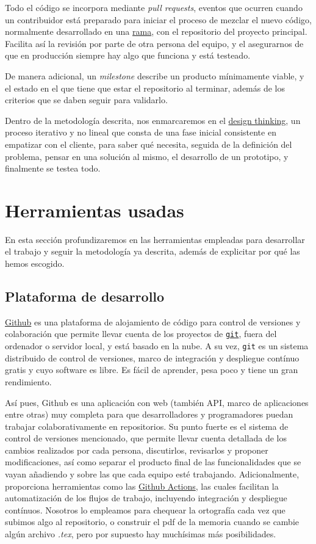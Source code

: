 Todo el código se incorpora mediante \textit{pull requests}, eventos que ocurren cuando un contribuidor está 
preparado para iniciar el proceso de mezclar el nuevo código, normalmente desarrollado en una \href{https://docs.github.com/github/collaborating-with-issues-and-pull-requests/about-branches}{rama}, 
con el repositorio del proyecto principal. Facilita así la revisión por parte de otra persona del equipo, y el 
asegurarnos de que en producción siempre hay algo que funciona y está testeado.

De manera adicional, un \textit{milestone} describe un producto mínimamente viable, y el estado en el que tiene 
que estar el repositorio al terminar, además de los criterios que se daben seguir 
para validarlo.

Dentro de la metodología descrita, nos enmarcaremos en el \href{https://www.iebschool.com/blog/design-thinking-agile-scrum/}{design thinking}, 
un proceso iterativo y no lineal que consta de una fase inicial consistente en empatizar con el 
cliente, para saber qué necesita, seguida de la definición del problema, pensar en una solución al 
mismo, el desarrollo de un prototipo, y finalmente se testea todo. 

\section{Herramientas usadas}
En esta sección profundizaremos en las herramientas empleadas para desarrollar el trabajo y seguir 
la metodología ya descrita, además de explicitar por qué las hemos escogido.

\subsection{Plataforma de desarrollo} 
\href{https://github.com/}{Github} es una plataforma de alojamiento de código para control de versiones y 
colaboración que permite llevar cuenta de los proyectos de \href{https://git-scm.com/}{\tt git}, fuera del ordenador o 
servidor local, y está basado en la nube. A su vez, {\tt git} es un 
sistema distribuido de control de versiones, marco de integración y despliegue contínuo gratis y cuyo software es libre. Es fácil de 
aprender, pesa poco y tiene un gran rendimiento.

Así pues, Github es una aplicación con web (también API, marco de aplicaciones entre otras) muy completa 
para que desarrolladores y programadores puedan trabajar colaborativamente 
en repositorios. Su punto fuerte es el sistema de control de versiones mencionado, que permite llevar 
cuenta detallada 
de los cambios realizados por cada persona, discutirlos, revisarlos y proponer modificaciones, así como 
separar el producto final de las funcionalidades que se vayan añadiendo y sobre las que cada equipo esté 
trabajando. Adicionalmente, proporciona herramientas como las \href{https://github.com/features/actions}{Github Actions}, 
las cuales facilitan la automatización de los flujos de trabajo, incluyendo integración y despliegue contínuos.
Nosotros lo empleamos para chequear la ortografía cada vez que subimos algo al repositorio, o construir el pdf 
de la memoria cuando se cambie algún archivo \textit{.tex}, pero por supuesto hay muchísimas más posibilidades.

